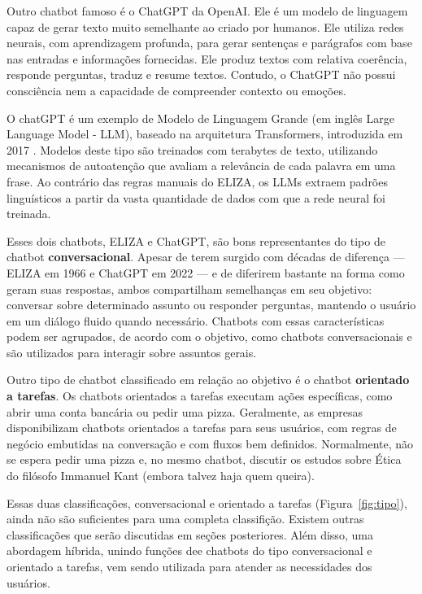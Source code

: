 \documentclass[14pt,a4paper,oneside]{book}
\begin{document}
Outro chatbot famoso é o ChatGPT da OpenAI. 
Ele é um modelo de linguagem capaz de gerar texto muito semelhante ao criado por humanos. 
Ele utiliza redes neurais, com aprendizagem profunda, para gerar sentenças e parágrafos com base nas entradas e informações fornecidas. 
Ele produz textos com relativa coerência, responde perguntas, traduz e resume textos. 
Contudo, o ChatGPT não possui consciência nem a capacidade de compreender contexto ou emoções. 

O chatGPT é um exemplo de Modelo de Linguagem Grande (em inglês Large Language Model - LLM), baseado na arquitetura Transformers, introduzida em 2017 \cite{Vaswani2017}. 
Modelos deste tipo são treinados com terabytes de texto, utilizando mecanismos de autoatenção que avaliam a relevância de cada palavra em uma frase. 
Ao contrário das regras manuais do ELIZA, os LLMs extraem padrões linguísticos a partir da vasta quantidade de dados com que a rede neural foi treinada.

Esses dois chatbots, ELIZA e ChatGPT, são bons representantes do tipo de chatbot \textbf{conversacional}. 
Apesar de terem surgido com décadas de diferença — ELIZA em 1966 e ChatGPT em 2022 — e de diferirem bastante na forma como geram suas respostas, ambos compartilham semelhanças em seu objetivo: conversar sobre determinado assunto ou responder perguntas, mantendo o usuário em um diálogo fluido quando necessário. 
Chatbots com essas características podem ser agrupados, de acordo com o objetivo, como chatbots conversacionais e são utilizados para interagir sobre assuntos gerais.

Outro tipo de chatbot classificado em relação ao objetivo é o chatbot \textbf{orientado a tarefas}. 
Os chatbots orientados a tarefas executam ações específicas, como abrir uma conta bancária ou pedir uma pizza. 
Geralmente, as empresas disponibilizam chatbots orientados a tarefas para seus usuários, com regras de negócio embutidas na conversação e com fluxos bem definidos. 
Normalmente, não se espera pedir uma pizza e, no mesmo chatbot, discutir os estudos sobre Ética do filósofo Immanuel Kant (embora talvez haja quem queira). 

Essas duas classificações, conversacional e orientado a tarefas  (Figura~\ref{fig:tipo}), ainda não são suficientes para uma completa classifição. 
Existem outras classificações que serão discutidas em seções posteriores. Além disso, uma abordagem híbrida, unindo funções dee  chatbots do tipo conversacional e orientado a tarefas, vem sendo utilizada para atender as necessidades dos usuários. 
\end{document}
